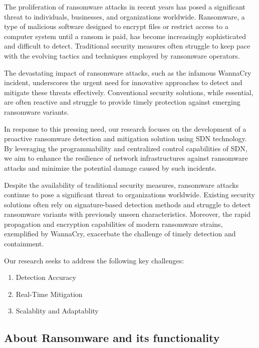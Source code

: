 \documentclass[12pt,letterpaper]{article}
\begin{document}
        The proliferation of ransomware attacks in recent years has posed a significant threat to individuals, businesses, and organizations worldwide. Ransomware, a type of malicious software designed to encrypt files or restrict access to a computer system until a ransom is paid, has become increasingly sophisticated and difficult to detect. Traditional security measures often struggle to keep pace with the evolving tactics and techniques employed by ransomware operators.
        
        The devastating impact of ransomware attacks, such as the infamous WannaCry incident, underscores the urgent need for innovative approaches to detect and mitigate these threats effectively. Conventional security solutions, while essential, are often reactive and struggle to provide timely protection against emerging ransomware variants.
        
        In response to this pressing need, our research focuses on the development of a proactive ransomware detection and mitigation solution using \ac{SDN} technology. By leveraging the programmability and centralized control capabilities of SDN, we aim to enhance the resilience of network infrastructures against ransomware attacks and minimize the potential damage caused by such incidents.
        
        Despite the availability of traditional security measures, ransomware attacks continue to pose a significant threat to organizations worldwide. Existing security solutions often rely on signature-based detection methods and struggle to detect ransomware variants with previously unseen characteristics. Moreover, the rapid propagation and encryption capabilities of modern ransomware strains, exemplified by WannaCry, exacerbate the challenge of timely detection and containment.
        
        Our research seeks to address the following key challenges:

        \begin{enumerate}
            \item Detection Accuracy
            \item Real-Time Mitigation
            \item Scalablity and Adaptablity
        \end{enumerate}

    \subsection{About Ransomware and its functionality}
\end{document}
